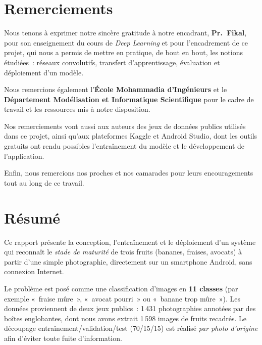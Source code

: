 \chapter*{Remerciements}
\thispagestyle{plain}

Nous tenons à exprimer notre sincère gratitude à notre encadrant, \textbf{Pr.~Fikal}, pour son enseignement du cours de \emph{Deep Learning} et pour l’encadrement de ce projet, qui nous a permis de mettre en pratique, de bout en bout, les notions étudiées~: réseaux convolutifs, transfert d’apprentissage, évaluation et déploiement d’un modèle.

Nous remercions également l’\textbf{École Mohammadia d’Ingénieurs} et le \textbf{Département Modélisation et Informatique Scientifique} pour le cadre de travail et les ressources mis à notre disposition.

Nos remerciements vont aussi aux auteurs des jeux de données publics utilisés dans ce projet, ainsi qu’aux plateformes Kaggle et Android Studio, dont les outils gratuits ont rendu possibles l’entraînement du modèle et le développement de l’application.

Enfin, nous remercions nos proches et nos camarades pour leurs encouragements tout au long de ce travail.

\clearpage

\chapter*{Résumé}
\thispagestyle{plain}

\begin{absbox}
Ce rapport présente la conception, l’entraînement et le déploiement d’un système qui reconnaît le \emph{stade de maturité} de trois fruits (bananes, fraises, avocats) à partir d’une simple photographie, directement sur un smartphone Android, sans connexion Internet.
\end{absbox}

Le problème est posé comme une classification d’images en \textbf{11 classes} (par exemple «~fraise mûre~», «~avocat pourri~» ou «~banane trop mûre~»). Les données proviennent de deux jeux publics~: 1\,431 photographies annotées par des boîtes englobantes, dont nous avons extrait 1\,598 images de fruits recadrés. Le découpage entraînement/validation/test (70/15/15) est réalisé \emph{par photo d’origine} afin d’éviter toute fuite d’information.

